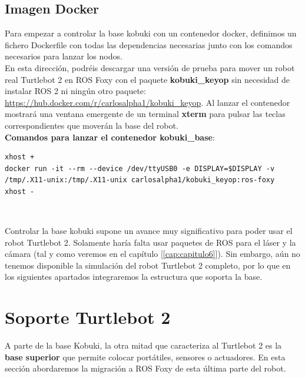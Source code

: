 \subsection{Imagen Docker}
\label{sec:kobuki_base_docker}

Para empezar a controlar la base kobuki con un contenedor docker, definimos un fichero Dockerfile con todas las dependencias necesarias junto con los comandos necesarios para lanzar los nodos.\\

En esta dirección, podréis descargar una versión de prueba para mover un robot real Turtlebot 2 en ROS Foxy con el paquete \textbf{kobuki\_keyop} sin necesidad de instalar ROS 2 ni ningún otro paquete: \url{https://hub.docker.com/r/carlosalpha1/kobuki_keyop}. Al lanzar el contenedor mostrará una ventana emergente de un terminal \textbf{xterm} para pulsar las teclas correspondientes que moverán la base del robot.\\

\textbf{Comandos para lanzar el contenedor kobuki\_base}:\\
\begin{lstlisting}
xhost +
docker run -it --rm --device /dev/ttyUSB0 -e DISPLAY=$DISPLAY -v /tmp/.X11-unix:/tmp/.X11-unix carlosalpha1/kobuki_keyop:ros-foxy
xhost -
\end{lstlisting}\

Controlar la base kobuki supone un avance muy significativo para poder usar el robot Turtlebot 2. Solamente haría falta usar paquetes de ROS para el láser y la cámara (tal y como veremos en el capítulo [\ref{cap:capitulo6}]). Sin embargo, aún no tenemos disponible la simulación del robot Turtlebot 2 completo, por lo que en los siguientes apartados integraremos la estructura que soporta la base.\\



\section{Soporte Turtlebot 2}
\label{sec:soporte_turtlebot2}

A parte de la base Kobuki, la otra mitad que caracteriza al Turtlebot 2 es la \textbf{base superior} que permite colocar portátiles, sensores o actuadores. En esta sección abordaremos la migración a ROS Foxy de esta última parte del robot.\\

